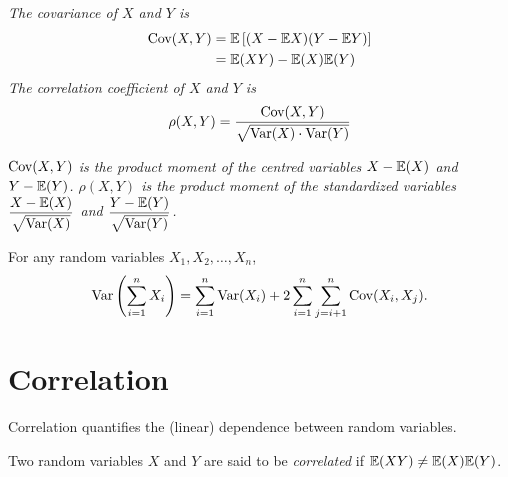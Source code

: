 \begin{definition}
\ben
\it The \emph{covariance} of $X$ and $Y$ is 
\begin{align*}
\text{Cov}(X,Y) 	& = \mathbb{E}\left[(X-\mathbb{E} X)(Y-\mathbb{E} Y)\right] \\
			& = \mathbb{E}(XY) - \mathbb{E}(X)\mathbb{E}(Y)
\end{align*}
\it The \emph{correlation coefficient} of $X$ and $Y$ is 
\[
\rho(X,Y) = \frac{\text{Cov}(X,Y)}{\sqrt{\text{Var}(X)\cdot\text{Var}(Y)}}
\]
\een
\end{definition}

\begin{remark}
\bit 
\it $\text{Cov}(X,Y)$ is the product moment of the \emph{centred} variables $X-\mathbb{E}(X)$ and $Y-\mathbb{E}(Y)$.
\it $\rho(X,Y)$ is the product moment of the \emph{standardized} variables $\displaystyle\frac{X-\mathbb{E}(X)}{\sqrt{\text{Var}(X)}}$ and $\displaystyle\frac{Y-\mathbb{E}(Y)}{\sqrt{\text{Var}(Y)}}$.
\eit
\end{remark}


\begin{remark}
For any random variables $X_1,X_2,\ldots,X_n$,
\[
\text{Var}\left(\sum_{i=1}^n X_i\right) = \sum_{i=1}^n \text{Var}(X_i) + 2\sum_{i=1}^{n}\sum_{j=i+1}^n \text{Cov}(X_i,X_j).
\]
\end{remark}

\section{Correlation}
Correlation quantifies the (linear) dependence between random variables.

\begin{definition} 
Two random variables $X$ and $Y$ are said to be \emph{correlated} if $\mathbb{E}(XY)\neq\mathbb{E}(X)\mathbb{E}(Y)$.%
\end{definition}

